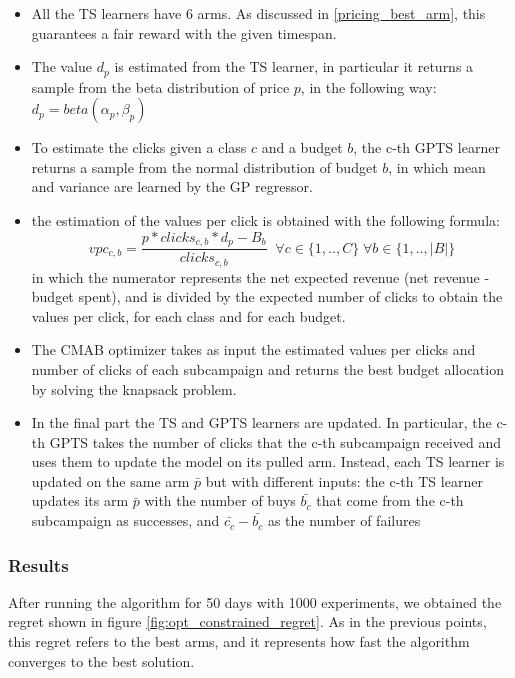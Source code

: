 \begin{itemize}
    \item All the TS learners have 6 arms. As discussed in \ref{pricing_best_arm}, this guarantees a fair reward with the given timespan. 
    \item The value $d_p$ is estimated from the TS learner, in particular it returns a sample from the beta distribution of price $p$, in the following way: $d_p = beta(\alpha_p, \beta_p)$
    \item To estimate the clicks given a class $c$ and a budget $b$, the c-th GPTS learner returns a sample from the normal distribution of budget $b$, in which mean and variance are learned by the GP regressor.
    \item the estimation of the values per click is obtained with the following formula: 
    \[ vpc_{c,b} = \frac{p * clicks_{c,b} * d_p - B_b}{clicks_{c,b}} \;\; \forall c \in \{1,..,C\} \; \forall b \in \{1,..,|B|\} \]
    in which the numerator represents the net expected revenue (net revenue - budget spent), and is divided by the expected number of clicks to obtain the values per click, for each class and for each budget.
    \item The CMAB optimizer takes as input the estimated values per clicks and number of clicks of each subcampaign and returns the best budget allocation by solving the knapsack problem.
    \item In the final part the TS and GPTS learners are updated. In particular, the c-th GPTS takes the number of clicks that the c-th subcampaign received and uses them to update the model on its pulled arm.
    Instead, each TS learner is updated on the same arm $\bar{p}$ but with different inputs: the c-th TS learner updates its arm $\bar{p}$ with the number of buys $\bar{b_c}$ that come from the c-th subcampaign as successes, and $\bar{c_c} - \bar{b_c}$ as the number of failures
\end{itemize}

\subsubsection{Results}
After running the algorithm for 50 days with 1000 experiments, we obtained the regret shown in figure \ref{fig:opt_constrained_regret}.
As in the previous points, this regret refers to the best arms, and it represents how fast the algorithm converges to the best solution.

